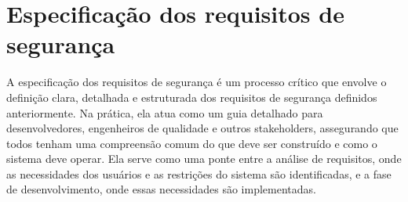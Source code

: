     \section{Especificação dos requisitos de segurança}
    A especificação dos requisitos de segurança é um processo crítico que envolve o definição clara, detalhada e estruturada dos requisitos de segurança definidos anteriormente. Na prática, ela atua como um guia detalhado para desenvolvedores, engenheiros de qualidade e outros stakeholders, assegurando que todos tenham uma compreensão comum do que deve ser construído e como o sistema deve operar. Ela serve como uma ponte entre a análise de requisitos, onde as necessidades dos usuários e as restrições do sistema são identificadas, e a fase de desenvolvimento, onde essas necessidades são implementadas.
    
